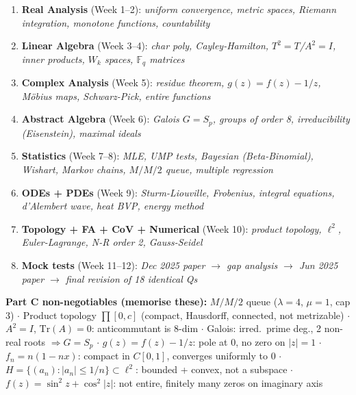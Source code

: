 \documentclass[12pt,a4paper]{article}
\begin{document}
\begin{tcolorbox}[
  enhanced, breakable,
  colback=bluelight!40, colframe=blueprimary,
  boxrule=1pt, arc=6pt,
  title={\textbf{At-a-Glance: What to Study, In What Order}},
  fonttitle=\bfseries\color{white},
  attach boxed title to top left={yshift=-3mm, xshift=6mm},
  boxed title style={colback=blueprimary, arc=4pt}
]
\small
\begin{enumerate}[leftmargin=1.5em, itemsep=3pt]
  \item \textbf{Real Analysis} (Week 1--2): \textit{uniform convergence, metric spaces, Riemann integration, monotone functions, countability}
  \item \textbf{Linear Algebra} (Week 3--4): \textit{char poly, Cayley-Hamilton, $T^2=T$/$A^2=I$, inner products, $W_k$ spaces, $\mathbb{F}_q$ matrices}
  \item \textbf{Complex Analysis} (Week 5): \textit{residue theorem, $g(z)=f(z)-1/z$, Möbius maps, Schwarz-Pick, entire functions}
  \item \textbf{Abstract Algebra} (Week 6): \textit{Galois $G=S_p$, groups of order 8, irreducibility (Eisenstein), maximal ideals}
  \item \textbf{Statistics} (Week 7--8): \textit{MLE, UMP tests, Bayesian (Beta-Binomial), Wishart, Markov chains, $M/M/2$ queue, multiple regression}
  \item \textbf{ODEs + PDEs} (Week 9): \textit{Sturm-Liouville, Frobenius, integral equations, d'Alembert wave, heat BVP, energy method}
  \item \textbf{Topology + FA + CoV + Numerical} (Week 10): \textit{product topology, $\ell^2$, Euler-Lagrange, N-R order 2, Gauss-Seidel}
  \item \textbf{Mock tests} (Week 11--12): \textit{Dec 2025 paper $\to$ gap analysis $\to$ Jun 2025 paper $\to$ final revision of 18 identical Qs}
\end{enumerate}
\tcblower
\small\textbf{Part C non-negotiables (memorise these):}
$M/M/2$ queue ($\lambda=4$, $\mu=1$, cap 3) $\cdot$ Product topology $\prod[0,c]$ (compact, Hausdorff, connected, not metrizable) $\cdot$ $A^2=I$, $\mathrm{Tr}(A)=0$: anticommutant is 8-dim $\cdot$ Galois: irred.\ prime deg., 2 non-real roots $\Rightarrow G=S_p$ $\cdot$ $g(z)=f(z)-1/z$: pole at 0, no zero on $|z|=1$ $\cdot$ $f_n=n(1-nx)$: compact in $C[0,1]$, converges uniformly to 0 $\cdot$ $H=\{(a_n):|a_n|\le 1/n\}\subset\ell^2$: bounded + convex, not a subspace $\cdot$ $f(z)=\sin^2z+\cos^2|z|$: not entire, finitely many zeros on imaginary axis
\end{tcolorbox}
\end{document}
